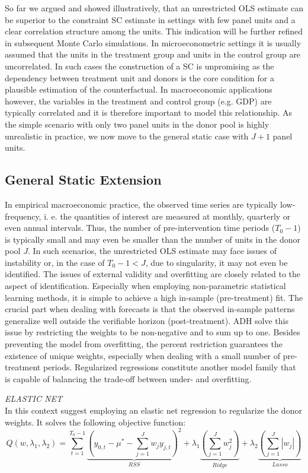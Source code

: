 So far we argued and showed illustratively, that an unrestricted \ac{OLS} estimate can be superior to the constraint \ac{SC} estimate in settings with few panel units and a clear correlation structure among the units. This indication will be further refined in subsequent Monte Carlo simulations. In microeconometric settings it is usually assumed that the units in the treatment group and units in the control group are uncorrelated. In such cases the construction of a \ac{SC} is unpromising as the dependency between treatment unit and donors is the core condition for a plausible estimation of the counterfactual. In macroeconomic applications however, the variables in the treatment and control group (e.g. \ac{GDP}) are typically correlated and it is therefore important to model this relationship. As the simple scenario with only two panel units in the donor pool is highly unrealistic in practice, we now move to the general static case with $J+1$ panel units.
\subsection{General Static Extension}
In empirical macroeconomic practice, the observed time series are typically low- frequency, i. e.
the quantities of interest are measured at monthly, quarterly or even annual intervals. Thus, the number of pre-intervention time periods ($T_0 - 1$) is typically small and may even be smaller than the number of units in the donor pool $J$. In such scenarios, the unrestricted \ac{OLS} estimate may face issues of instability or, in the case of $T_0 - 1 < J$, due to singularity, it may not even be identified.
The issues of external validity and overfitting are closely related to the aspect of identification. Especially when employing non-parametric statistical learning methods, it is simple to achieve a high in-sample (pre-treatment) fit. The crucial part when dealing with forecasts is that the observed in-sample patterns generalize well outside the verifiable horizon (post-treatment). \ac{ADH} solve this issue by restricting the weights to be non-negative and to sum up to one. Besides preventing the model from overfitting, the percent restriction guarantees the existence of unique weights, especially when dealing with a small number of pre-treatment periods. Regularized regressions constitute another model family that is capable of balancing the trade-off between under- and overfitting. 

\textit{ELASTIC NET} \\
In this context \cite{doudchenko:2016} suggest employing an elastic net regression to regularize the donor weights. It solves the following objective function:
\[
Q(w, \lambda_1, \lambda_2) = 
\sum_{t=1}^{T_0-1}\underbrace{\left(y_{0,t} - \mu^* - \sum_{j = 1}^{J} w_j y_{j,t} \right)^2}_{RSS} + \lambda_1 \underbrace{\left( \sum_{j = 1}^{J} w_j^2 \right)}_{Ridge} + 
\lambda_2 \underbrace{\left( \sum_{j = 1}^{J} |w_j| \right)  }_{Lasso}
\]

